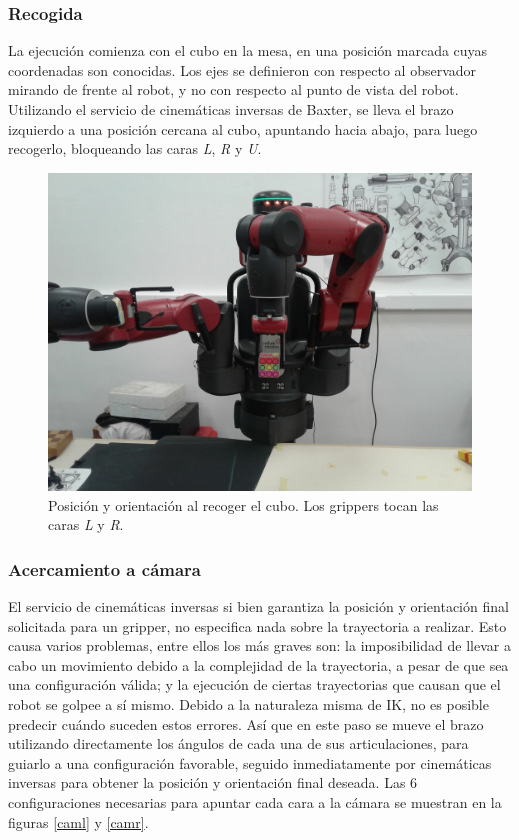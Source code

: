 \subsubsection{Recogida}
La ejecución comienza con el cubo en la mesa, en una posición marcada cuyas coordenadas son conocidas. Los ejes se definieron con respecto al observador mirando de frente al robot, y no con respecto al punto de vista del robot. Utilizando el servicio de cinemáticas inversas de Baxter, se lleva el brazo izquierdo a una posición cercana al cubo, apuntando hacia abajo, para luego recogerlo, bloqueando las caras \textit{L}, \textit{R} y \textit{U}.

\begin{figure}[h!]
	\centering
	\includegraphics[scale=0.1]{figures/pick}
	\caption{Posición y orientación al recoger el cubo. Los grippers tocan las caras \textit{L} y \textit{R}.}
	\label{pick}
\end{figure}

\subsubsection{Acercamiento a cámara}
El servicio de cinemáticas inversas si bien garantiza la posición y orientación final solicitada para un gripper, no especifica nada sobre la trayectoria a realizar. Esto causa varios problemas, entre ellos los más graves son: la imposibilidad de llevar a cabo un movimiento debido a la complejidad de la trayectoria, a pesar de que sea una configuración válida; y la ejecución de ciertas trayectorias que causan que el robot se golpee a sí mismo. Debido a la naturaleza misma de IK, no es posible predecir cuándo suceden estos errores. Así que en este paso se mueve el brazo utilizando directamente los ángulos de cada una de sus articulaciones, para guiarlo a una configuración favorable, seguido inmediatamente por cinemáticas inversas para obtener la posición y orientación final deseada. Las 6 configuraciones necesarias para apuntar cada cara a la cámara se muestran en la figuras \ref{caml} y \ref{camr}.

